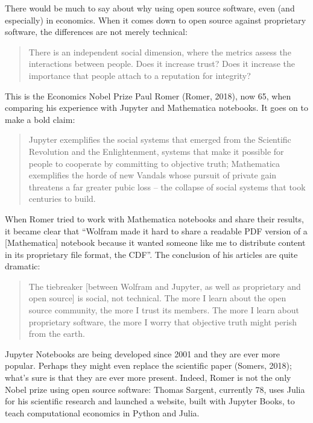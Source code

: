 \documentclass[letterpaper,10pt,english]{jupyterBook}
\begin{document}
\sphinxAtStartPar
There would be much to say about why using open source software, even (and especially) in economics. When it comes down to open source against proprietary software, the differences are not merely technical:
\begin{quote}

\sphinxAtStartPar
There is an independent social dimension, where the metrics assess the interactions between people. Does it increase trust? Does it increase the importance that people attach to a reputation for integrity?
\end{quote}

\sphinxAtStartPar
This is the Economics Nobel Prize Paul Romer (Romer, 2018), now 65, when comparing his experience with Jupyter and Mathematica notebooks. It goes on to make a bold claim:
\begin{quote}

\sphinxAtStartPar
Jupyter exemplifies the social systems that emerged from the Scientific Revolution and the Enlightenment, systems that make it possible for people to cooperate by committing to objective truth; Mathematica exemplifies the horde of new Vandals whose pursuit of private gain threatens a far greater pubic loss – the collapse of social systems that took centuries to build.
\end{quote}

\sphinxAtStartPar
When Romer tried to work with Mathematica notebooks and share their results, it became clear that “Wolfram made it hard to share a readable PDF version of a {[}Mathematica{]} notebook because it wanted someone like me to distribute content in its proprietary file format, the CDF”. The conclusion of his articles are quite dramatic:
\begin{quote}

\sphinxAtStartPar
The tie\sphinxhyphen{}breaker {[}between Wolfram and Jupyter, as well as proprietary and open source{]} is social, not technical. The more I learn about the open source community, the more I trust its members. The more I learn about proprietary software, the more I worry that objective truth might perish from the earth.
\end{quote}

\sphinxAtStartPar
Jupyter Notebooks are being developed since 2001 and they are ever more popular. Perhaps they might even replace the scientific paper (Somers, 2018); what’s sure is that they are ever more present. Indeed, Romer is not the only Nobel prize using open source software: Thomas Sargent, currently 78, uses Julia for his scientific research and launched a website,  built with Jupyter Books, to teach computational economics in Python and Julia.
\end{document}
